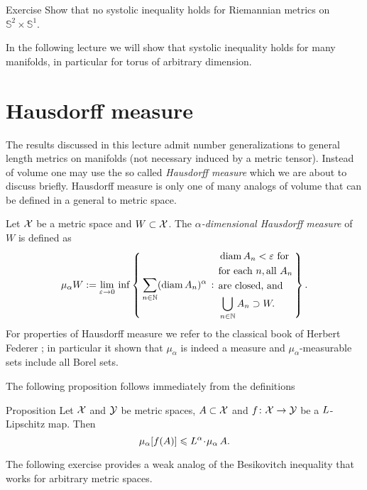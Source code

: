 \begin{thm}{Exercise}\label{ex:sysS2xS1}
Show that no systolic inequality holds for Riemannian metrics on $\mathbb{S}^2\times\mathbb{S}^1$.
\end{thm}

In the following lecture we will show that systolic inequality holds for many manifolds, in particular for torus of arbitrary dimension.

\section{Hausdorff measure}\label{sec:hausdorff-measure}

The results discussed in this lecture admit number generalizations to general length metrics on manifolds (not necessary induced by a metric tensor).
Instead of volume one may use the so called 
\emph{Hausdorff measure} which we are about to discuss briefly.
Hausdorff measure is only one of many analogs of volume that can be defined in a general to metric space.

Let $\mathcal{X}$ be a metric space and $W\subset \mathcal{X}$.
The \emph{$\alpha$-dimensional Hausdorff measure} of $W$ is defined as 
$$\mu_\alpha W
\mathrel{:=}
\lim_{\varepsilon\to0}
\,
\inf
\left\{\,{\sum_{n\in\mathbb{N}}(\operatorname{\rm diam}\nolimits A_n)^\alpha}\,:\,{\begin{aligned}
&\operatorname{\rm diam}\nolimits A_n<\varepsilon\ \text{for}
\\
&\text{for each}\ n,\text{all}\  A_n
\\
&\text{are closed, and} 
\\
& \bigcup_{n\in\mathbb{N}}A_n\supset W.
\end{aligned}
}\,\right\}.$$
For properties of Hausdorff measure we refer to the classical book of  Herbert Federer \cite{federer};
in particular it shown that $\mu_\alpha$ is indeed a measure and $\mu_\alpha$-measurable sets include all Borel sets.

The following proposition follows immediately from the definitions

\begin{thm}{Proposition}\label{prop:bilip-measure}
Let $\mathcal{X}$ and $\mathcal{Y}$ be metric spaces, $A\subset \mathcal{X}$
and
 $f\colon \mathcal{X}\to \mathcal{Y}$ be a $L$-Lipschitz map. 
Then 
\[\mu_\alpha [f(A)]\le \Lip^\alpha\cdot\mu_\alpha\, A.\]

\end{thm}

The following exercise provides a weak analog of the Besikovitch inequality that works for arbitrary metric spaces.

